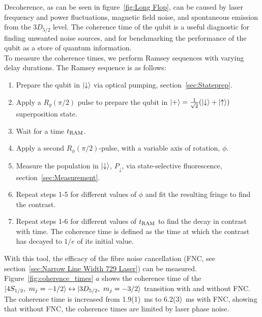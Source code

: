     Decoherence, as can be seen in figure~\ref{fig:Long Flop}, can be caused by laser frequency and power fluctuations, magnetic field noise, and spontaneous emission from the $3D_{5/2}$ level. The coherence time of the qubit is a useful diagnostic for finding unwanted noise sources, and for benchmarking the performance of the qubit as a store of quantum information.\\
    To measure the coherence times, we perform Ramsey sequences with varying delay durations. The Ramsey sequence is as follows:
    \begin{enumerate}
        \item Prepare the qubit in $\ket{\downarrow}$ via optical pumping, section~\ref{sec:Stateprep}.
        \item Apply a $R_y(\pi/2)$ pulse to prepare the qubit in $\ket{+} = \frac{1}{\sqrt{2}}(\ket{\downarrow} + \ket{\uparrow})$ superposition state.
        \item Wait for a time $t_{\rm RAM}$.
        \item Apply a second $R_\phi(\pi/2)$-pulse, with a variable axis of rotation, $\phi$. 
        \item Measure the population in $\ket{\downarrow}$, $P_\downarrow$, via state-selective fluorescence, section~\ref{sec:Measurement}.
        \item Repeat steps 1-5 for different values of $\phi$ and fit the resulting fringe to find the contrast.
        \item Repeat steps 1-6 for different values of $t_{\rm RAM}$ to find the decay in contrast with time. The coherence time is defined as the time at which the contrast has decayed to $1/e$ of its initial value.
    \end{enumerate}
    With this tool, the efficacy of the fibre noise cancellation (FNC, see section~\ref{sec:Narrow Line Width 729 Laser}) can be measured. Figure~\ref{fig:coherence_times} $a$ shows the coherence time of the $\ket{4S_{1/2},~m_j=-1/2}\leftrightarrow\ket{3D_{5/2},~m_j=-3/2}$  transition with and without FNC. The coherence time is increased from 1.9(1)~\unit{\ms} to 6.2(3)~\unit{\ms} with FNC, showing that without FNC, the coherence times are limited by laser phase noise. \\
